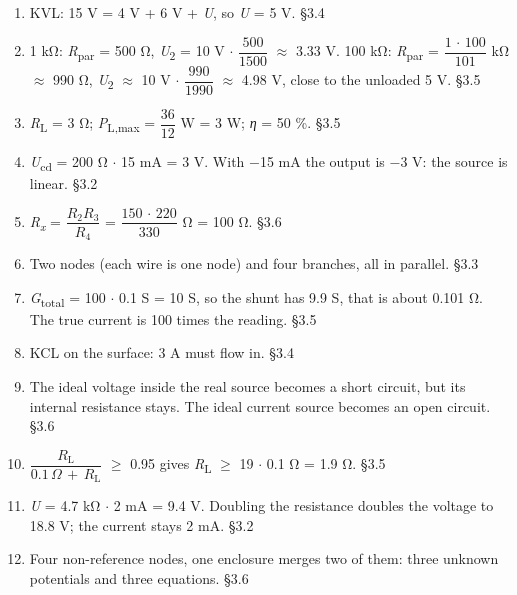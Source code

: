 \documentclass[11pt]{article}
\begin{document}
\begin{keepsection}
\begin{enumerate}
\item KVL: 15 V = 4 V + 6 V + \textit{U}, so \textit{U} = 5 V. \hfill{\small\color{FAUblue}§3.4}
\item 1 kΩ: \textit{R}\textsubscript{par} = 500 Ω, \textit{U}\textsubscript{2} = 10 V \ensuremath{\cdot} {\small\ensuremath{\dfrac{500}{1500}}} \ensuremath{\approx} 3.33 V. 100 kΩ: \textit{R}\textsubscript{par} = {\small\ensuremath{\dfrac{1\, \cdot \, 100}{101}}} kΩ \ensuremath{\approx} 990 Ω, \textit{U}\textsubscript{2} \ensuremath{\approx} 10 V \ensuremath{\cdot} {\small\ensuremath{\dfrac{990}{1990}}} \ensuremath{\approx} 4.98 V, close to the unloaded 5 V. \hfill{\small\color{FAUblue}§3.5}
\item \textit{R}\textsubscript{L} = 3 Ω; \textit{P}\textsubscript{L,max} = {\small\ensuremath{\dfrac{36}{12}}} W = 3 W; \textit{η} = 50 \%. \hfill{\small\color{FAUblue}§3.5}
\item \textit{U}\textsubscript{cd} = 200 Ω \ensuremath{\cdot} 15 mA = 3 V. With \ensuremath{-}15 mA the output is \ensuremath{-}3 V: the source is linear. \hfill{\small\color{FAUblue}§3.2}
\item \textit{R}\textsubscript{\textit{x}} = {\small\ensuremath{\dfrac{{R}_{2}{R}_{3}}{{R}_{4}}}} = {\small\ensuremath{\dfrac{150\, \cdot \, 220}{330}}} Ω = 100 Ω. \hfill{\small\color{FAUblue}§3.6}
\item Two nodes (each wire is one node) and four branches, all in parallel. \hfill{\small\color{FAUblue}§3.3}
\item \textit{G}\textsubscript{total} = 100 \ensuremath{\cdot} 0.1 S = 10 S, so the shunt has 9.9 S, that is about 0.101 Ω. The true current is 100 times the reading. \hfill{\small\color{FAUblue}§3.5}
\item KCL on the surface: 3 A must flow in. \hfill{\small\color{FAUblue}§3.4}
\item The ideal voltage inside the real source becomes a short circuit, but its internal resistance stays. The ideal current source becomes an open circuit. \hfill{\small\color{FAUblue}§3.6}
\item {\small\ensuremath{\dfrac{{R}_{\mathrm{L}}}{0.1\, Ω\, +\, {R}_{\mathrm{L}}}}} \ensuremath{\geq} 0.95 gives \textit{R}\textsubscript{L} \ensuremath{\geq} 19 \ensuremath{\cdot} 0.1 Ω = 1.9 Ω. \hfill{\small\color{FAUblue}§3.5}
\item \textit{U} = 4.7 kΩ \ensuremath{\cdot} 2 mA = 9.4 V. Doubling the resistance doubles the voltage to 18.8 V; the current stays 2 mA. \hfill{\small\color{FAUblue}§3.2}
\item Four non-reference nodes, one enclosure merges two of them: three unknown potentials and three equations. \hfill{\small\color{FAUblue}§3.6}

\end{enumerate}
\end{keepsection}
\end{document}
